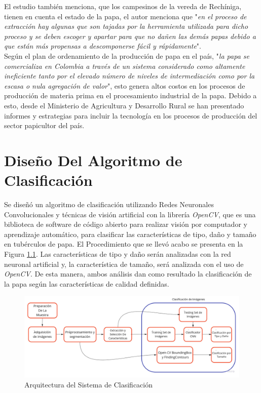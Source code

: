 El estudio también menciona, que los campesinos de la vereda de Rechíniga, tienen en cuenta  el estado de la papa, el autor menciona que "\textit{en el proceso de extracción hay algunas que son tajadas por la herramienta utilizada para dicho proceso y se deben escoger y apartar para que no dañen las demás papas debido a que están más propensas a descomponerse fácil y rápidamente}".\\

Según el plan de ordenamiento de la producción de papa en el país, "\textit{la  papa  se  comercializa  en  Colombia  a  través  de  un  sistema  considerado  como altamente ineficiente tanto por el elevado número de niveles de intermediación como por la escasa o nula agregación de valor}", esto genera altos costos en los procesos de producción de materia prima en el procesamiento industrial de la papa. Debido a esto, desde el Ministerio de Agricultura y Desarrollo Rural se han presentado informes y estrategias para incluir la tecnología en los procesos de producción del sector papicultor del país.  


\chapter{Diseño Del Algoritmo de Clasificación}


Se diseñó un algoritmo de clasificación utilizando Redes Neuronales Convolucionales y técnicas de visión artificial con la librería \textit{OpenCV}, que es una biblioteca de software de código abierto para realizar visión por computador y aprendizaje automático, para clasificar las características de tipo, daño y tamaño en tubérculos de papa. El Procedimiento que se llevó acabo se presenta en la Figura \ref{fig:flujogeneral}. Las características de tipo y daño serán analizadas con la red neuronal artificial y, la característica de tamaño, será analizada con el uso de \textit{OpenCV}. De esta manera, ambos análisis dan como resultado la clasificación de la papa según las características de calidad definidas. \\

\begin{figure}[ht]
	\centering
	\includegraphics[scale=0.28]{Figs/FGGeneral.jpg}
	\caption{Arquitectura del Sistema de Clasificación}
	\label{fig:flujogeneral}
\end{figure}


